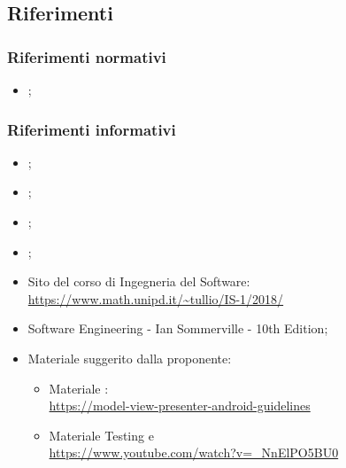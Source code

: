 \subsection{Riferimenti}
    \subsubsection {Riferimenti normativi}
        \begin{itemize}
        \item \NdP;
    \end{itemize}
    \subsubsection {Riferimenti informativi}
        \begin{itemize}
        \item \AdR;
        \item \PdP;
        \item \PdQ;
        \item \SdF;
        \item Sito del corso di Ingegneria del Software: \\ \url{https://www.math.unipd.it/~tullio/IS-1/2018/}
        \item  Software Engineering - Ian Sommerville - 10th Edition;
        \item Materiale suggerito dalla proponente:
        \begin{itemize}
            \item Materiale :
           \\ \href{https://medium.com/@cervonefrancesco/model-view-presenter-android-guidelines-94970b430ddf}{https://model-view-presenter-android-guidelines}
            \item Materiale Testing e 
           \\ \url{https://www.youtube.com/watch?v=_NnElPO5BU0}
        \end{itemize}
        
    \end{itemize}
